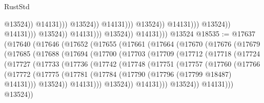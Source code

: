 \begin{lexlean}{RustStd}
\begin{coremodule}
                                                                @13524))
                                                            @14131)))
                                                      @13524))
                                                  @14131)))
                                            @13524))
                                        @14131)))
                                  @13524))
                              @14131)))
                        @13524))
                    @14131)))
              @13524))
          @14131)))
    @13524
@18535 := @17637
    (@17640
      (@17646
        (@17652
          (@17655
            (@17661
              (@17664
                (@17670
                  (@17676
                    (@17679
                      (@17685
                        (@17688
                          (@17694
                            (@17700
                              (@17703
                                (@17709
                                  (@17712
                                    (@17718
                                      (@17724
                                        (@17727
                                          (@17733
                                            (@17736
                                              (@17742
                                                (@17748
                                                  (@17751
                                                    (@17757
                                                      (@17760
                                                        (@17766
                                                          (@17772
                                                            (@17775
                                                              (@17781
                                                                (@17784
                                                                  (@17790
                                                                    (@17796
                                                                      (@17799 @18487)
                                                                      @14131)))
                                                                @13524))
                                                            @14131)))
                                                      @13524))
                                                  @14131)))
                                            @13524))
                                        @14131)))
                                  @13524))

\end{coremodule}
\end{lexlean}
